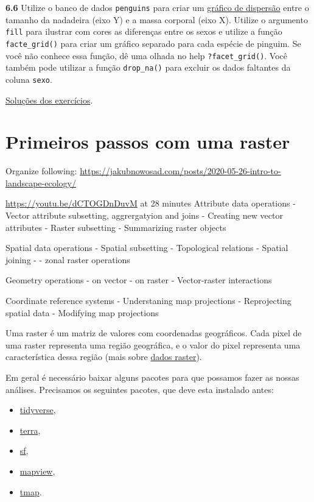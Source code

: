 \documentclass[
]{article}
\providecommand{\tightlist}{%
  \setlength{\itemsep}{0pt}\setlength{\parskip}{0pt}}
\begin{document}
\textbf{6.6}
Utilize o banco de dados \texttt{penguins} para criar um \href{https://analises-ecologicas.netlify.app/cap6.html\#gr\%C3\%A1fico-de-dispers\%C3\%A3o-scatter-plot}{gráfico de dispersão} entre o tamanho da nadadeira (eixo Y) e a massa corporal (eixo X). Utilize o argumento \texttt{fill} para ilustrar com cores as diferenças entre os sexos e utilize a função \texttt{facte\_grid()} para criar um gráfico separado para cada espécie de pinguim. Se você não conhece essa função, dê uma olhada no help \texttt{?facet\_grid()}. Você também pode utilizar a função \texttt{drop\_na()} para excluir os dados faltantes da coluna \texttt{sexo}.

\href{https://exercicios-livro-aer.netlify.app/cap.-6---visualiza\%C3\%A7\%C3\%A3o-de-dados.html}{Soluções dos exercícios}.

\newpage{}

\hypertarget{cap25}{%
\section{Primeiros passos com uma raster}\label{cap25}}

Organize following:
\url{https://jakubnowosad.com/posts/2020-05-26-intro-to-landscape-ecology/}

\url{https://youtu.be/dCTOGDnDuvM} at 28 minutes
Attribute data operations
- Vector attribute subsetting, aggrergatyion and joins
- Creating new vector attributes
- Raster subsetting
- Summarizing raster objects

Spatial data operations
- Spatial subsetting
- Topological relations
- Spatial joining
-
- zonal raster operations

Geometry operations
- on vector
- on raster
- Vector-raster interactions

Coordinate reference systems
- Understaning map projections
- Reprojecting spatial data
- Modifying map projections

Uma raster é um matriz de valores com coordenadas geográficos. Cada pixel de uma raster representa uma região geográfica, e o valor do pixel representa uma característica dessa região (mais sobre \href{https://docs.qgis.org/3.22/pt_BR/docs/gentle_gis_introduction/raster_data.html}{dados raster}).

Em geral é necessário baixar alguns pacotes para que possamos fazer as nossas análises. Precisamos os seguintes pacotes, que deve esta instalado antes:

\begin{itemize}
\tightlist
\item
  \href{https://www.tidyverse.org/}{tidyverse},
\item
  \href{https://rspatial.org/terra/pkg/index.html}{terra},
\item
  \href{https://r-spatial.github.io/sf/}{sf},
\item
  \href{https://r-spatial.github.io/mapview/}{mapview},
\item
  \href{https://r-tmap.github.io/tmap-book/}{tmap}.
\end{itemize}
\end{document}
